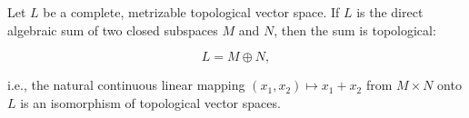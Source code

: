 Let $L$ be a complete, metrizable topological vector space. If $L$ is the direct algebraic sum of two closed subspaces $M$ and $N$, then the sum is topological:

$$L = M \oplus N,$$

i.e., the natural continuous linear mapping $(x_1, x_2) \mapsto x_1 + x_2$ from $M \times N$ onto $L$ is an isomorphism of topological vector spaces.
